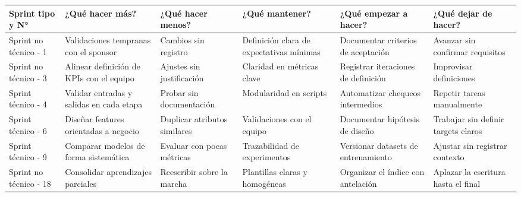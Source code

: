 \documentclass[
11pt, %
]{charter}
\begin{document}
\begin{table}[htpb]
\renewcommand{\arraystretch}{1.4}
\begin{tabular}{|>{\raggedright\arraybackslash}p{1.8cm}|
                >{\raggedright\arraybackslash}p{2.3cm}|
                >{\raggedright\arraybackslash}p{2.3cm}|
                >{\raggedright\arraybackslash}p{2.3cm}|
                >{\raggedright\arraybackslash}p{2.3cm}|
                >{\raggedright\arraybackslash}p{2.3cm}|}
\hline
\rowcolor[HTML]{CCCCCC} 
\textbf{Sprint tipo y N°} & \textbf{¿Qué hacer más?} & \textbf{¿Qué hacer menos?} & \textbf{¿Qué mantener?} & \textbf{¿Qué empezar a hacer?} & \textbf{¿Qué dejar de hacer?} \\
\hline
Sprint no técnico - 1 & Validaciones tempranas con el sponsor & Cambios sin registro & Definición clara de expectativas mínimas & Documentar criterios de aceptación & Avanzar sin confirmar requisitos \\
\hline
Sprint no técnico - 3 & Alinear definición de KPIs con el equipo & Ajustes sin justificación & Claridad en métricas clave & Registrar iteraciones de definición & Improvisar definiciones \\
\hline
Sprint técnico - 4 & Validar entradas y salidas en cada etapa & Probar sin documentación & Modularidad en scripts & Automatizar chequeos intermedios & Repetir tareas manualmente \\
\hline
Sprint técnico - 6 & Diseñar features orientadas a negocio & Duplicar atributos similares & Validaciones con el equipo & Documentar hipótesis de diseño & Trabajar sin definir targets claros \\
\hline
Sprint técnico - 9 & Comparar modelos de forma sistemática & Evaluar con pocas métricas & Trazabilidad de experimentos & Versionar datasets de entrenamiento & Ajustar sin registrar contexto \\
\hline
Sprint no técnico - 18 & Consolidar aprendizajes parciales & Reescribir sobre la marcha & Plantillas claras y homogéneas & Organizar el índice con antelación & Aplazar la escritura hasta el final \\
\hline
\end{tabular}
\end{table}
\end{document}
